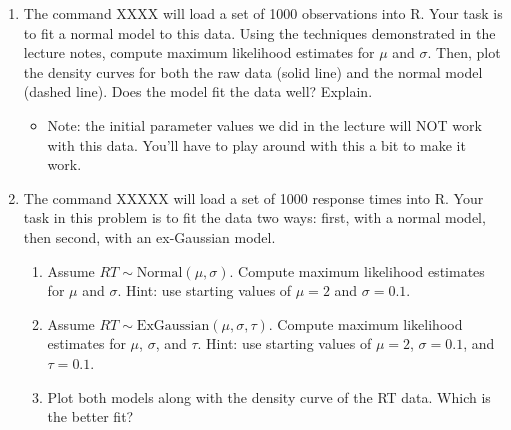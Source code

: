 \documentclass[10pt]{article}
\begin{document}
\begin{enumerate}
 \item The command XXXX will load a set of 1000 observations into R.  Your task is to fit a normal model to this data.  Using the techniques demonstrated in the lecture notes, compute maximum likelihood estimates for $\mu$ and $\sigma$.  Then, plot the density curves for both the raw data (solid line) and the normal model (dashed line).  Does the model fit the data well?  Explain.

   \begin{itemize}
   \item Note: the initial parameter values we did in the lecture will NOT work with this data.  You'll have to play around with this a bit to make it work.
   \end{itemize}


 \item The command XXXXX will load a set of 1000 response times into R.  Your task in this problem is to fit the data two ways: first, with a normal model, then second, with an ex-Gaussian model.

   \begin{enumerate}
   \item Assume $RT \sim \text{Normal}(\mu,\sigma)$.  Compute maximum likelihood estimates for $\mu$ and $\sigma$.  Hint: use starting values of $\mu=2$ and $\sigma=0.1$.

   \item Assume $RT \sim \text{ExGaussian}(\mu,\sigma,\tau)$.  Compute maximum likelihood estimates for $\mu$, $\sigma$, and $\tau$.  Hint: use starting values of $\mu=2$, $\sigma=0.1$, and $\tau=0.1$.

     \item Plot both models along with the density curve of the RT data.  Which is the better fit?
   \end{enumerate}
  \end{enumerate}
\end{document}
